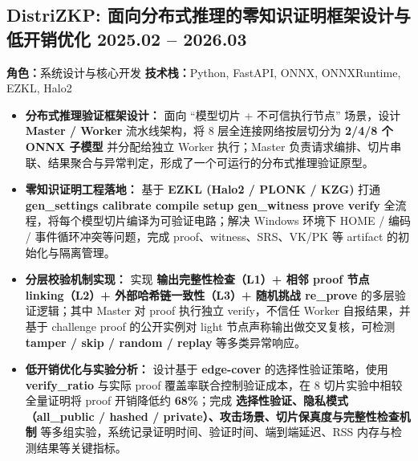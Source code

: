 \documentclass[10pt]{article}
\begin{document}
\subsection{\texorpdfstring{DistriZKP: 面向分布式推理的零知识证明框架设计与低开销优化 \hfill \rm{\small 2025.02 -- 2026.03}}{DistriZKP: 面向分布式推理的零知识证明框架设计与低开销优化}}
\vspace{0.1em}
\small{\textbf{角色：}系统设计与核心开发 \quad \textbf{技术栈：}Python, FastAPI, ONNX, ONNXRuntime, EZKL, Halo2}
\vspace{0.2em}
\begin{itemize}
    \item \textbf{分布式推理验证框架设计：} 面向 ``模型切片 + 不可信执行节点'' 场景，设计 \textbf{Master / Worker} 流水线架构，将 8 层全连接网络按层切分为 \textbf{2/4/8 个 ONNX 子模型} 并分配给独立 Worker 执行；Master 负责请求编排、切片串联、结果聚合与异常判定，形成了一个可运行的分布式推理验证原型。
    \item \textbf{零知识证明工程落地：} 基于 \textbf{EZKL (Halo2 / PLONK / KZG)} 打通 \textbf{gen\_settings \rightarrow calibrate \rightarrow compile \rightarrow setup \rightarrow gen\_witness \rightarrow prove \rightarrow verify} 全流程，将每个模型切片编译为可验证电路；解决 Windows 环境下 HOME / 编码 / 事件循环冲突等问题，完成 proof、witness、SRS、VK/PK 等 artifact 的初始化与隔离管理。
    \item \textbf{分层校验机制实现：} 实现 \textbf{输出完整性检查（L1）+ 相邻 proof 节点 linking（L2）+ 外部哈希链一致性（L3）+ 随机挑战 re\_prove} 的多层验证逻辑；其中 Master 对 proof 执行独立 verify，不信任 Worker 自报结果，并基于 challenge proof 的公开实例对 light 节点声称输出做交叉复核，可检测 \textbf{tamper / skip / random / replay} 等多类异常响应。
    \item \textbf{低开销优化与实验分析：} 设计基于 \textbf{edge-cover} 的选择性验证策略，使用 \textbf{verify\_ratio} 与实际 proof 覆盖率联合控制验证成本，在 8 切片实验中相较全量证明将 proof 开销降低约 \textbf{68\%}；完成 \textbf{选择性验证、隐私模式（all\_public / hashed / private）、攻击场景、切片保真度与完整性检查机制} 等多组实验，系统记录证明时间、验证时间、端到端延迟、RSS 内存与检测结果等关键指标。
\end{itemize}

\end{document}
